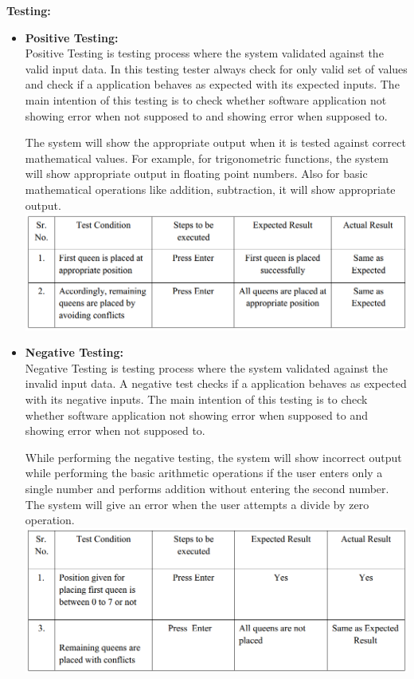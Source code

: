 \documentclass[a4paper,12pt]{article}
\begin{document}
\noindent \textbf{Testing:}
\begin{itemize}
\item \textbf{Positive Testing:}\\
Positive Testing is testing process where the system validated against the valid input data. In this testing tester always check for only valid set of values and check if a application behaves as expected with its expected inputs. The main intention of this testing is to check whether software application not showing error when not supposed to and showing error when supposed to.

The system will show the appropriate output when it is tested against correct mathematical values. For example, for trigonometric functions, the system will show appropriate output in floating point numbers. Also for basic mathematical operations like addition, subtraction, it will show appropriate output.\\
\includegraphics[width=\textwidth]{queen_positive}


\item \textbf{Negative Testing:}\\
Negative Testing is testing process where the system validated against the invalid input data. A negative test checks if a application behaves as expected with its negative inputs. The main intention of this testing is to check whether software application not showing error when supposed to and showing error when not supposed to.

While performing the negative testing, the system will show incorrect output while performing the basic arithmetic operations if the user enters only a single number and performs addition without entering the second number. The system will give an error when the user attempts a divide by zero operation.\\
\includegraphics[width=\textwidth]{queen_negative}

\end{itemize}
\end{document}
